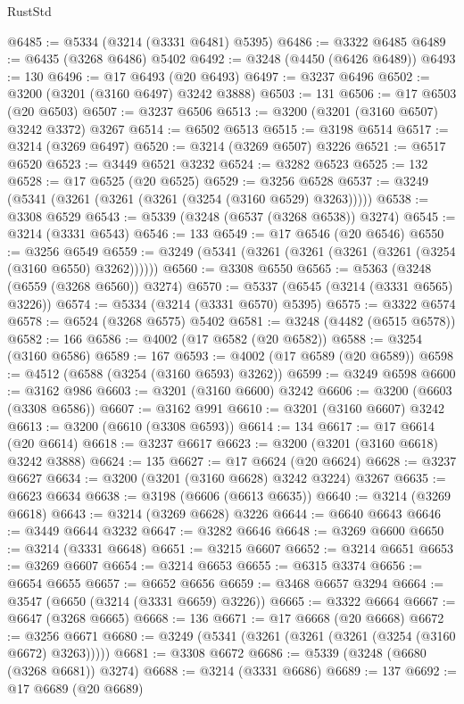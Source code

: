 \begin{lexlean}{RustStd}
\begin{coremodule}
{\begin{coremodule}
{{{{{{{{{{{{{{{{{{{{{{{{{@6485 := @5334 (@3214 (@3331 @6481) @5395)
@6486 := @3322 @6485
@6489 := @6435 (@3268 @6486) @5402
@6492 := @3248 (@4450 (@6426 @6489))
@6493 := 130
@6496 := @17 @6493 (@20 @6493)
@6497 := @3237 @6496
@6502 := @3200 (@3201 (@3160 @6497) @3242 @3888)
@6503 := 131
@6506 := @17 @6503 (@20 @6503)
@6507 := @3237 @6506
@6513 := @3200 (@3201 (@3160 @6507) @3242 @3372) @3267
@6514 := @6502 @6513
@6515 := @3198 @6514
@6517 := @3214 (@3269 @6497)
@6520 := @3214 (@3269 @6507) @3226
@6521 := @6517 @6520
@6523 := @3449 @6521 @3232
@6524 := @3282 @6523
@6525 := 132
@6528 := @17 @6525 (@20 @6525)
@6529 := @3256 @6528
@6537 := @3249 (@5341 (@3261 (@3261 (@3261 (@3254 (@3160 @6529) @3263)))))
@6538 := @3308 @6529
@6543 := @5339 (@3248 (@6537 (@3268 @6538)) @3274)
@6545 := @3214 (@3331 @6543)
@6546 := 133
@6549 := @17 @6546 (@20 @6546)
@6550 := @3256 @6549
@6559 := @3249 (@5341 (@3261 (@3261 (@3261 (@3261 (@3254 (@3160 @6550) @3262))))))
@6560 := @3308 @6550
@6565 := @5363 (@3248 (@6559 (@3268 @6560)) @3274)
@6570 := @5337 (@6545 (@3214 (@3331 @6565) @3226))
@6574 := @5334 (@3214 (@3331 @6570) @5395)
@6575 := @3322 @6574
@6578 := @6524 (@3268 @6575) @5402
@6581 := @3248 (@4482 (@6515 @6578))
@6582 := 166
@6586 := @4002 (@17 @6582 (@20 @6582))
@6588 := @3254 (@3160 @6586)
@6589 := 167
@6593 := @4002 (@17 @6589 (@20 @6589))
@6598 := @4512 (@6588 (@3254 (@3160 @6593) @3262))
@6599 := @3249 @6598
@6600 := @3162 @986
@6603 := @3201 (@3160 @6600) @3242
@6606 := @3200 (@6603 (@3308 @6586))
@6607 := @3162 @991
@6610 := @3201 (@3160 @6607) @3242
@6613 := @3200 (@6610 (@3308 @6593))
@6614 := 134
@6617 := @17 @6614 (@20 @6614)
@6618 := @3237 @6617
@6623 := @3200 (@3201 (@3160 @6618) @3242 @3888)
@6624 := 135
@6627 := @17 @6624 (@20 @6624)
@6628 := @3237 @6627
@6634 := @3200 (@3201 (@3160 @6628) @3242 @3224) @3267
@6635 := @6623 @6634
@6638 := @3198 (@6606 (@6613 @6635))
@6640 := @3214 (@3269 @6618)
@6643 := @3214 (@3269 @6628) @3226
@6644 := @6640 @6643
@6646 := @3449 @6644 @3232
@6647 := @3282 @6646
@6648 := @3269 @6600
@6650 := @3214 (@3331 @6648)
@6651 := @3215 @6607
@6652 := @3214 @6651
@6653 := @3269 @6607
@6654 := @3214 @6653
@6655 := @6315 @3374
@6656 := @6654 @6655
@6657 := @6652 @6656
@6659 := @3468 @6657 @3294
@6664 := @3547 (@6650 (@3214 (@3331 @6659) @3226))
@6665 := @3322 @6664
@6667 := @6647 (@3268 @6665)
@6668 := 136
@6671 := @17 @6668 (@20 @6668)
@6672 := @3256 @6671
@6680 := @3249 (@5341 (@3261 (@3261 (@3261 (@3254 (@3160 @6672) @3263)))))
@6681 := @3308 @6672
@6686 := @5339 (@3248 (@6680 (@3268 @6681)) @3274)
@6688 := @3214 (@3331 @6686)
@6689 := 137
@6692 := @17 @6689 (@20 @6689)
}}}}}}}}}}}}}}}}}}}}}}}}}
\end{coremodule}}
\end{coremodule}
\end{lexlean}

